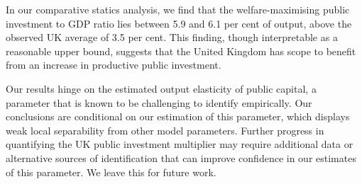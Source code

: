 \documentclass[titlepage, 11pt, a4paper]{article}
\renewcommand{\&}{and}
\begin{document}
In our comparative statics analysis, we find that the welfare-maximising public investment to GDP ratio lies between 5.9 and 6.1 per cent of output, above the observed UK average of 3.5 per cent. 
This finding, though interpretable as a reasonable upper bound, suggests that the United Kingdom has scope to benefit from an increase in productive public investment.

Our results hinge on the estimated output elasticity of public capital, a parameter that is known to be challenging to identify empirically. Our conclusions are conditional on our estimation of this parameter, which displays weak local separability from other model parameters. Further progress in quantifying the UK public investment multiplier may require additional data or alternative sources of identification that can improve confidence in our estimates of this parameter.  
We leave this for future work.


 
 
\end{document}
